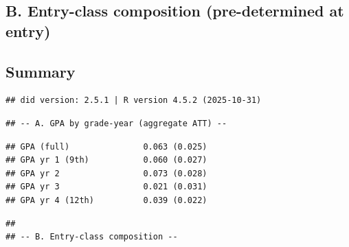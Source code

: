 \documentclass[
]{article}
\begin{document}
\hypertarget{b.-entry-class-composition-pre-determined-at-entry}{%
\subsection{B. Entry-class composition (pre-determined at
entry)}\label{b.-entry-class-composition-pre-determined-at-entry}}

\begin{table}[htbp]
   \caption{Entry-Class Composition: All 9th-Grade Entrants}\label{tab: entrant composition}
   \centerline{}
\end{table}

\hypertarget{summary}{%
\subsection{Summary}\label{summary}}

\begin{verbatim}
## did version: 2.5.1 | R version 4.5.2 (2025-10-31)
\end{verbatim}

\begin{verbatim}
## -- A. GPA by grade-year (aggregate ATT) --
\end{verbatim}

\begin{verbatim}
## GPA (full)               0.063 (0.025)
## GPA yr 1 (9th)           0.060 (0.027)
## GPA yr 2                 0.073 (0.028)
## GPA yr 3                 0.021 (0.031)
## GPA yr 4 (12th)          0.039 (0.022)
\end{verbatim}

\begin{verbatim}
## 
## -- B. Entry-class composition --
\end{verbatim}
\end{document}
